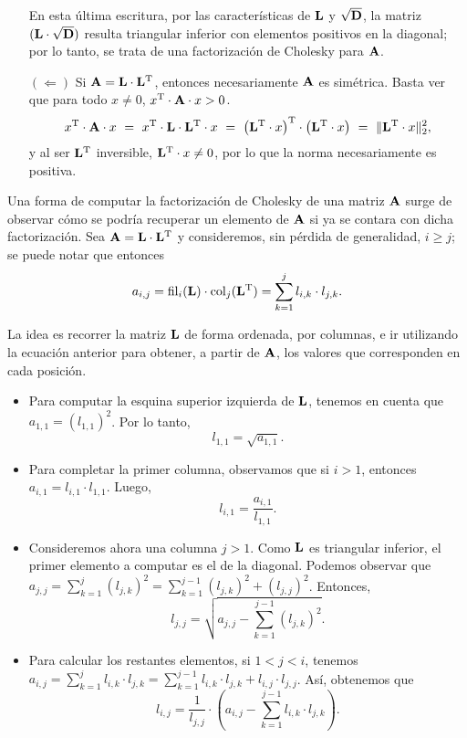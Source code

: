 \begin{itemize}
    En esta última escritura, por las características de $\mathbf{L}$ y
    $\mathbf{\sqrt{D}}$, la matriz $(\mathbf{L} \cdot \mathbf{\sqrt{D}})$ resulta
    triangular inferior con elementos positivos en la diagonal; por lo tanto,
    se trata de una factorización de Cholesky para $\mathbf{A}$.

\item[$(\Leftarrow)$] Si $\mathbf{A} = \mathbf{L} \cdot \mathbf{L}^{\mathrm{T}}$, entonces
    necesariamente $\mathbf{A}$ es simétrica. Basta ver que para todo $x \neq 0$,
    $x^{\mathrm{T}} \cdot \mathbf{A} \cdot x > 0$.
    \[ x^{\mathrm{T}} \cdot \mathbf{A} \cdot x
        \ = \ x^{\mathrm{T}} \cdot \mathbf{L} \cdot \mathbf{L}^{\mathrm{T}} \cdot x
        \ = \ \left( \mathbf{L}^{\mathrm{T}} \cdot x \right)^{\mathrm{T}} \cdot
            \left( \mathbf{L}^{\mathrm{T}} \cdot x \right)
        \ = \ \Vert \mathbf{L}^{\mathrm{T}} \cdot x \Vert_2^2, \]
    y al ser $\mathbf{L}^{\mathrm{T}}$ inversible, $\mathbf{L}^{\mathrm{T}} \cdot x \neq 0$,
    por lo que la norma necesariamente es positiva.  
\end{itemize}

Una forma de computar la factorización de Cholesky de una matriz $\mathbf{A}$
surge de observar cómo se podría recuperar un elemento de $\mathbf{A}$ si ya
se contara con dicha factorización. Sea $\mathbf{A} = \mathbf{L} \cdot
\mathbf{L}^{\mathrm{T}}$ y consideremos, sin pérdida de generalidad, $i \geq j$; se puede notar que entonces
\[ a_{i,j} = \operatorname{fil}_i(\mathbf{L}) \cdot \operatorname{col}_j(\mathbf{L}^{\mathrm{T}})
           = \sum_{k=1}^j l_{i,k} \cdot l_{j,k}. \]

La idea es recorrer la matriz $\mathbf{L}$ de forma ordenada, por columnas,
e ir utilizando la ecuación anterior para obtener, a partir de $\mathbf{A}$,
los valores que corresponden en cada posición.
\begin{itemize}
\item Para computar la esquina superior izquierda de $\mathbf{L}$, tenemos en
    cuenta que $a_{1,1} = (l_{1,1})^2$. Por lo tanto,
        \[ l_{1,1} = \sqrt{a_{1,1}}. \]
\item Para completar la primer columna, observamos que si $i > 1$, entonces
    $a_{i,1} = l_{i,1} \cdot l_{1,1}$. Luego,
    \[ l_{i,1} = \frac{a_{i,1}}{l_{1,1}}. \]
\item Consideremos ahora una columna $j > 1$. Como $\mathbf{L}$ es triangular
    inferior, el primer elemento a computar es el de la diagonal. Podemos
    observar que $a_{j,j} = \sum_{k=1}^j (l_{j,k})^2 =
    \sum_{k=1}^{j-1} (l_{j,k})^2 + (l_{j,j})^2$. Entonces,
    \[ l_{j,j} = \sqrt{a_{j,j} - \sum_{k=1}^{j-1} (l_{j,k})^2}. \]
\item Para calcular los restantes elementos, si $1 < j < i$, tenemos
    $a_{i,j} = \sum_{k=1}^j l_{i,k} \cdot l_{j,k} =
    \sum_{k=1}^{j-1} l_{i,k} \cdot l_{j,k} + l_{i,j} \cdot l_{j,j}$. Así,
    obtenemos que
    \[ l_{i,j} = \frac{1}{l_{j,j}} \cdot
        \left( a_{i,j} - \sum_{k=1}^{j-1} l_{i,k} \cdot l_{j,k} \right). \]
\end{itemize}


